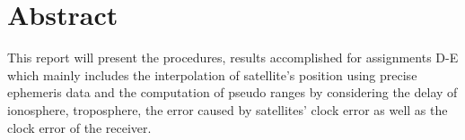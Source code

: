 \chapter{Abstract}
This report will present the procedures, results accomplished for assignments D-E which mainly includes the interpolation of satellite's position using precise ephemeris data and the computation of pseudo ranges by considering the delay of ionosphere, troposphere, the error caused by satellites' clock error as well as the clock error of the receiver.
